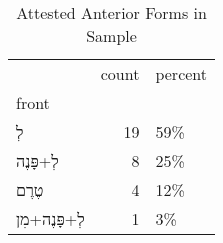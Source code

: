 \begin{table}[htbp!]
\centering
\caption{Attested Anterior Forms in Sample}
\label{table:ant_front}
\begin{tabular}{lrl}
\toprule
{} &  count & percent \\
front                      &        &         \\
\midrule
\texthebrew{לְ}            &     19 &     59\% \\
\texthebrew{לְ+פָּנֶה}     &      8 &     25\% \\
\texthebrew{טֶרֶם}         &      4 &     12\% \\
\texthebrew{לְ+פָּנֶה+מִן} &      1 &      3\% \\
\bottomrule
\end{tabular}
\end{table}

